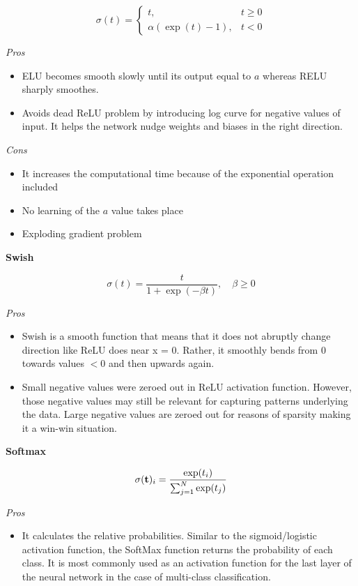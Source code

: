 $$
\sigma(t)=
\left\{
  \begin{array}{ll}
  t, & t\geq 0 \\
  \alpha(\exp(t)-1), & t<0
  \end{array}
\right.  
$$

\textit{Pros}

\begin{itemize}
  \item ELU becomes smooth slowly until its output equal to $a$ whereas RELU sharply smoothes.
  \item Avoids dead ReLU problem by introducing log curve for negative values of
input. It helps the network nudge weights and biases in the right direction.
\end{itemize}

\textit{Cons}

\begin{itemize}
  \item It increases the computational time because of the exponential operation
included
  \item No learning of the $a$ value takes place
  \item Exploding gradient problem
\end{itemize}

\textbf{Swish}

$$\sigma(t)=\displaystyle \frac{t}{1+\exp(-\beta t)}, \quad \beta \geq 0$$

\textit{Pros}

\begin{itemize}
  \item Swish is a smooth function that means that it does not abruptly change
direction like ReLU does near x = 0. Rather, it smoothly bends from 0 towards
values $< 0$ and then upwards again.
  \item Small negative values were zeroed out in ReLU activation function. However,
those negative values may still be relevant for capturing patterns underlying
the data. Large negative values are zeroed out for reasons of sparsity making it a win-win situation.
\end{itemize}

\textbf{Softmax}

$$\sigma({\bf t})_i=\displaystyle \frac{\exp(t_i)}{\sum_{j=1}^N\exp(t_j)}$$

\textit{Pros}

\begin{itemize}
  \item It calculates the relative probabilities. Similar to the sigmoid/logistic activation
function, the SoftMax function returns the probability of each class.
It is most commonly used as an activation function for the last layer of the neural
network in the case of multi-class classification.
\end{itemize}

